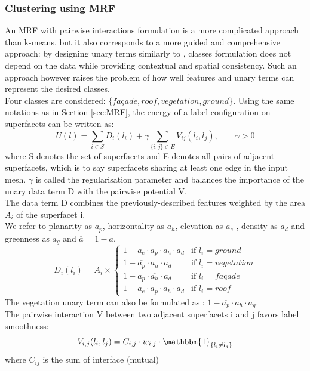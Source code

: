 \documentclass{kththesis}
\begin{document}
\subsubsection{Clustering using MRF}
An MRF with pairwise interactions formulation is a more complicated approach than k-means, but it also corresponds to a more guided and comprehensive approach: by designing unary terms similarly to \textcite{verdie}, classes formulation does not depend on the data while providing contextual and spatial consistency. Such an approach however raises the problem of how well features and unary terms can represent the desired classes. \\
Four classes are considered: $\{fa\textit{ç}ade, roof, vegetation, ground\}$.
Using the same notations as in Section \ref{sec:MRF}, the energy of a label configuration on superfacets can be written as: 
\[ U(l)=
\sum \limits_{i\in S} D_i(l_i) + \gamma  \sum \limits_{\{i,j\} \in E} V_{ij}(l_i, l_j) , \qquad \gamma>0
\] 
where S denotes the set of superfacets and E denotes all pairs of adjacent superfacets, which is to say superfacets sharing at least one edge in the input mesh. $\gamma$ is called  the regularisation parameter and balances the importance of the unary data term D with the pairwise potential V. \\
The data term D combines the previously-described features weighted by the area $A_i$ of the superfacet i. \\
We refer to planarity as $a_p$, horizontality as $a_h$, elevation as $a_e$ , density as $a_d$ and greenness as $a_g$ and $\overline{a} = 1 - a$.
$$
D_i(l_i) = A_i \times  \left\{
    \begin{array}{lll}
        1 -  \overline{a_e} \cdot a_p \cdot a_h  \cdot \overline{a_d}& \mbox{if } l_i=ground \\
        1 -   \overline{a_p} \cdot a_h  \cdot a_d &  \mbox{if } l_i=vegetation   \\
        1 -   a_p \cdot \overline{a_h}  \cdot a_d & \mbox{if } l_i=fa\textit{ç}ade \\
        1 -  a_e \cdot a_p \cdot a_h  \cdot \overline{a_d} & \mbox{if } l_i=roof
    \end{array}
\right.
$$
The vegetation unary term can also be formulated as : $ 1 -   \overline{a_p} \cdot a_h  \cdot a_g $. \\
The pairwise interaction V between two adjacent
superfacets i and j favors label smoothness: 
$$V_{i,j}(l_i, l_j)=C_{i,j} \cdot w_{i,j} \cdot \mathbbm{1}_{\{l_i \neq l_j\}}$$
where $C_{ij}$ is the sum of interface (mutual)
\end{document}
